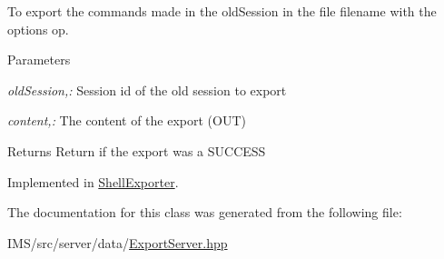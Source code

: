 To export the commands made in the oldSession in the file filename with the options op. 


\begin{DoxyParams}{Parameters}
\item[{\em oldSession,:}]Session id of the old session to export \item[{\em content,:}]The content of the export (OUT) \end{DoxyParams}
\begin{DoxyReturn}{Returns}
Return if the export was a SUCCESS 
\end{DoxyReturn}


Implemented in \hyperlink{classShellExporter_a6170de97246f7e2ad1c7fb61d7850e90}{ShellExporter}.



The documentation for this class was generated from the following file:\begin{DoxyCompactItemize}
\item 
IMS/src/server/data/\hyperlink{ExportServer_8hpp}{ExportServer.hpp}\end{DoxyCompactItemize}
